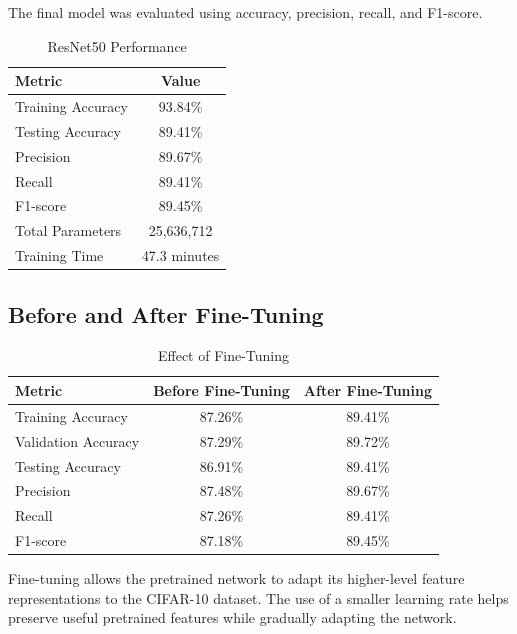 \documentclass[12pt,a4paper]{article}
\begin{document}
The final model was evaluated using accuracy, precision, recall, and F1-score.

\begin{table}[H]
\centering
\caption{ResNet50 Performance}
\begin{tabular}{lc}
\toprule
\textbf{Metric} & \textbf{Value} \\
\midrule
Training Accuracy & 93.84\% \\
Testing Accuracy & 89.41\% \\
Precision & 89.67\% \\
Recall & 89.41\% \\
F1-score & 89.45\% \\
Total Parameters & 25,636,712 \\
Training Time & 47.3 minutes \\
\bottomrule
\end{tabular}
\end{table}


\subsection{Before and After Fine-Tuning}

\begin{table}[H]
\centering
\caption{Effect of Fine-Tuning}
\begin{tabular}{lcc}
\toprule
\textbf{Metric} & \textbf{Before Fine-Tuning} & \textbf{After Fine-Tuning} \\
\midrule
Training Accuracy & 87.26\% & 89.41\% \\
Validation Accuracy & 87.29\% & 89.72\% \\
Testing Accuracy & 86.91\% & 89.41\% \\
Precision & 87.48\% & 89.67\% \\
Recall & 87.26\% & 89.41\% \\
F1-score & 87.18\% & 89.45\% \\
\bottomrule
\end{tabular}
\end{table}

Fine-tuning allows the pretrained network to adapt its higher-level feature representations to the CIFAR-10 dataset. The use of a smaller learning rate helps preserve useful pretrained features while gradually adapting the network.
\end{document}
